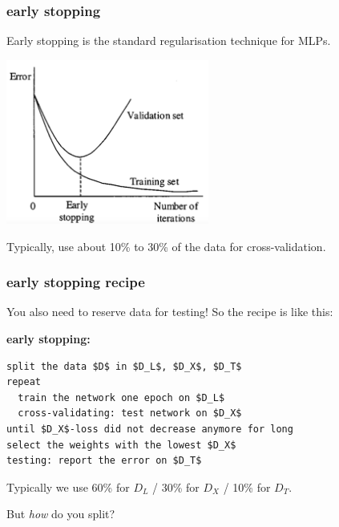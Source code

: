 \documentclass[USenglish,pdftex,compress,10pt,svgnamesi,handout]{beamer}
\begin{document}
\begin{frame}
\frametitle{early stopping}
Early stopping is the standard regularisation technique for MLPs. 

\vskip5mm
\includegraphics[width=0.5\textwidth]{Early-Stopping_Graph.png}
\vskip5mm

 Typically, use about 10\% to 30\% of the data for cross-validation. 

\end{frame}
\begin{frame}[fragile]
\frametitle{early stopping recipe}
 You also need to reserve data for testing!  So the recipe is like this:
\vskip5mm

\begin{beamerboxesrounded}[upper=def,lower=block body,width=1.03\textwidth,shadow]{\textbf{early stopping:}}
\begin{lstlisting}[mathescape]
split the data $D$ in $D_L$, $D_X$, $D_T$
repeat
  train the network one epoch on $D_L$
  cross-validating: test network on $D_X$
until $D_X$-loss did not decrease anymore for long 
select the weights with the lowest $D_X$
testing: report the error on $D_T$
\end{lstlisting}
\end{beamerboxesrounded}

Typically we use  
 60\% for $D_L$ /
 30\% for $D_X$ /
 10\% for $D_T$.
 
 But \textit{how} do you split?
\end{frame}
\end{document}
